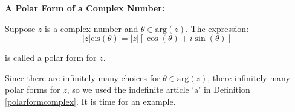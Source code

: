 \documentclass{ximera}
\begin{document}

\begin{definition} \label{polarformcomplex}   \textbf{A Polar Form of a Complex Number:} 

Suppose $z$ is a complex number and $\theta \in \text{arg}(z)$.  The expression:  \[|z| \text{cis}(\theta) = |z|\left[ \cos(\theta) + i \sin(\theta)\right]\]

is called a polar form for $z$.

\end{definition}


 										

Since there are infinitely many choices for $\theta \in \text{arg}(z)$, there infinitely many polar forms for $z$, so we used the indefinite article `a' in Definition \ref{polarformcomplex}.  It is time for an example.
\end{document}
